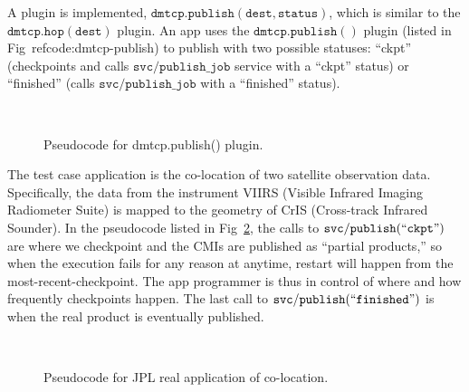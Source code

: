 \documentclass[conference]{IEEEtran}
\begin{document}
A plugin is implemented, $\mathtt{dmtcp.publish(dest, status)}$, which is similar to the $\mathtt{dmtcp.hop(dest)}$ plugin. An app uses the $\mathtt{dmtcp.publish()}$ plugin (listed in Fig~ref{code:dmtcp-publish}) to publish with two possible statuses: ``ckpt'' (checkpoints and calls $\mathtt{svc/publish\_job}$ service with a ``ckpt'' status) or ``finished'' (calls $\mathtt{svc/publish\_job}$ with a ``finished'' status).


\begin{figure}[!ht]
\vspace{0.1in}
\begin{center}
\begin{center}
\mbox{}\\[0.3em]
\end{center}
\hspace{\fill}%
\caption{Pseudocode for dmtcp.publish() plugin.}
\label{code:dmtcp-publish}
\end{center}
\end{figure}


The test case application is the co-location of two satellite observation data. Specifically, the data from the instrument VIIRS (Visible Infrared Imaging Radiometer Suite) is mapped to the geometry of CrIS (Cross-track Infrared Sounder). In the pseudocode listed in Fig~\ref{code:app}, the calls to $\mathtt{svc/publish(``ckpt")}$ are where we checkpoint and the CMIs are published as ``partial products,'' so when the execution fails for any reason at anytime, restart will happen from the most-recent-checkpoint. The app programmer is thus in control of where and how frequently checkpoints happen. The last call to $\mathtt{svc/publish(``finished")}$ is when the real product is eventually published.

\begin{figure}[!ht]
\vspace{0.1in}
\begin{center}
\begin{center}
\mbox{}\\[0.3em]
\end{center}
\hspace{\fill}%
\caption{Pseudocode for JPL real application of co-location.}
\label{code:app}
\end{center}
\end{figure}
\end{document}
